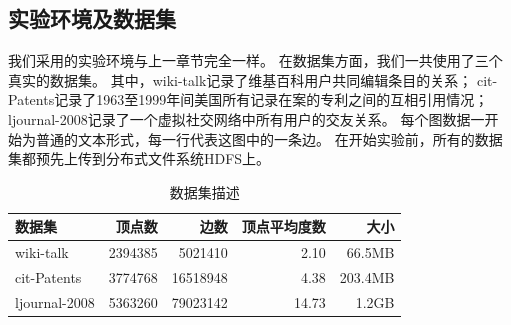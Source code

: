 \documentclass[master]{njuthesis}
\begin{document}
\subsection{实验环境及数据集}
我们采用的实验环境与上一章节完全一样。
在数据集方面，我们一共使用了三个真实的数据集。
其中，wiki-talk记录了维基百科用户共同编辑条目的关系；
cit-Patents记录了1963至1999年间美国所有记录在案的专利之间的互相引用情况；
ljournal-2008记录了一个虚拟社交网络中所有用户的交友关系。
每个图数据一开始为普通的文本形式，每一行代表这图中的一条边。
在开始实验前，所有的数据集都预先上传到分布式文件系统HDFS上。
\begin{table}[h]
\caption{数据集描述}
\label{tab:dataset2}
\centering
\begin{tabular}{|l|r|r|r|r|}
\hline
\textbf{数据集} & \textbf{顶点数} & \textbf{边数} & \textbf{顶点平均度数} & \textbf{大小} \\
\hline
wiki-talk     \footnotemark[1]       & \num{2394385} & \num{5021410}          &2.10                   & 66.5MB\\
\hline
cit-Patents      \footnotemark[2]     & \num{3774768}  & \num{16518948 }          & 4.38             & 203.4MB\\
\hline
ljournal-2008  \footnotemark[3] & \num{5363260} & \num{79023142}         & 14.73            &1.2GB\\
\hline
\end{tabular}
\end{table}
\end{document}
